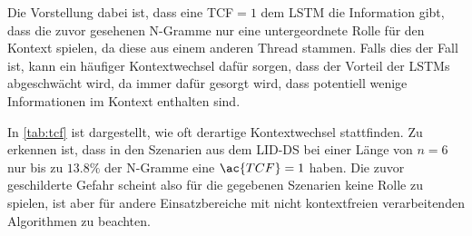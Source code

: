                 Die Vorstellung dabei ist, dass eine \ac{TCF}$= 1$ dem \ac{LSTM} die Information gibt, dass die zuvor gesehenen N-Gramme nur eine untergeordnete Rolle für den Kontext spielen, da diese aus einem anderen Thread stammen.
                Falls dies der Fall ist, kann ein häufiger Kontextwechsel dafür sorgen, dass der Vorteil der \ac{LSTM}s abgeschwächt wird, da immer dafür gesorgt wird, dass potentiell wenige Informationen im Kontext enthalten sind.\par\medskip

                In \autoref{tab:tcf} ist dargestellt, wie oft derartige Kontextwechsel stattfinden.
                Zu erkennen ist, dass in den Szenarien aus dem \ac{LID-DS} bei einer Länge von $n=6$ nur bis zu $13.8\%$ der N-Gramme eine $\ac{TCF}=1$ haben.
                Die zuvor geschilderte Gefahr scheint also für die gegebenen Szenarien keine Rolle zu spielen, ist aber für andere Einsatzbereiche mit nicht kontextfreien verarbeitenden Algorithmen zu beachten.

